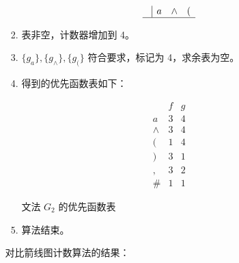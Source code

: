 \begin{enumerate}
\begin{enumerate}
\begin{enumerate}
            \begin{equation*}
                \begin{array}{c|ccc}
                      & a & \wedge & ( \\
                    \hline
                \end{array}
            \end{equation*}
            
            \item 表非空，计数器增加到 4。
            
            \item $\{g_a\}, \{g_\wedge\}, \{g_(\}$ 符合要求，标记为 4，求余表为空。
            
            \item 得到的优先函数表如下：
            
            \begin{table}[H]
                \centering
                \begin{equation*}
                    \begin{array}{c|cc}
                         & f & g \\
                         \hline
                         a & 3 & 4 \\
                         \wedge & 3 & 4 \\
                         ( & 1 & 4 \\
                         ) & 3 & 1 \\
                         , & 3 & 2 \\
                         \# & 1 & 1
                    \end{array}
                \end{equation*}
                \caption{文法 $G_2$ 的优先函数表}
                \label{tab:PF_3_1}
            \end{table}
            
            \item 算法结束。
            
        \end{enumerate}
        
        对比箭线图计数算法的结果：
        

\end{enumerate}
\end{enumerate}
